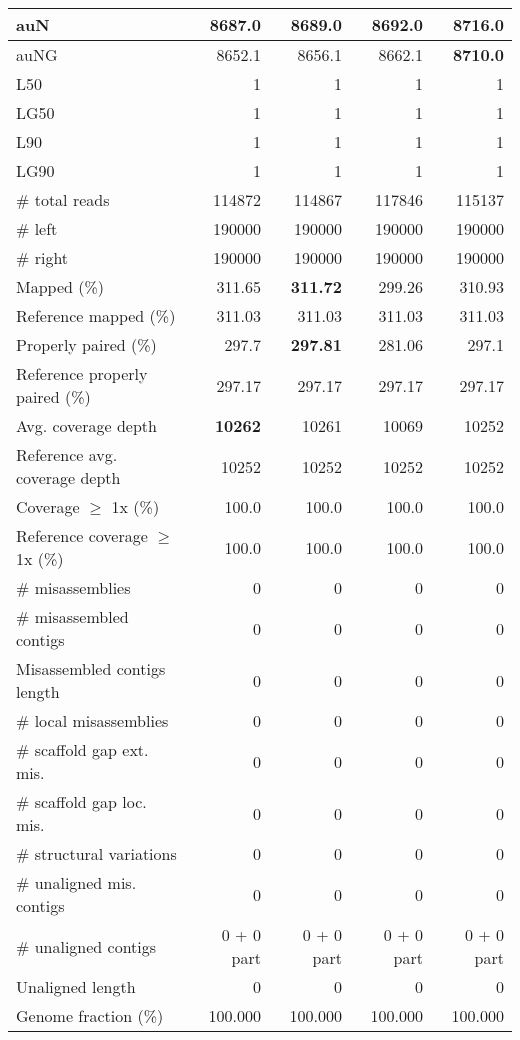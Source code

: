 \documentclass[12pt,a4paper]{article}
\begin{document}
\begin{table}[ht]
\begin{center}
\begin{tabular}{|l*{4}{|r}|}
auN & 8687.0 & 8689.0 & 8692.0 & {\bf 8716.0} \\ \hline
auNG & 8652.1 & 8656.1 & 8662.1 & {\bf 8710.0} \\ \hline
L50 & 1 & 1 & 1 & 1 \\ \hline
LG50 & 1 & 1 & 1 & 1 \\ \hline
L90 & 1 & 1 & 1 & 1 \\ \hline
LG90 & 1 & 1 & 1 & 1 \\ \hline
\# total reads & 114872 & 114867 & 117846 & 115137 \\ \hline
\# left & 190000 & 190000 & 190000 & 190000 \\ \hline
\# right & 190000 & 190000 & 190000 & 190000 \\ \hline
Mapped (\%) & 311.65 & {\bf 311.72} & 299.26 & 310.93 \\ \hline
Reference mapped (\%) & 311.03 & 311.03 & 311.03 & 311.03 \\ \hline
Properly paired (\%) & 297.7 & {\bf 297.81} & 281.06 & 297.1 \\ \hline
Reference properly paired (\%) & 297.17 & 297.17 & 297.17 & 297.17 \\ \hline
Avg. coverage depth & {\bf 10262} & 10261 & 10069 & 10252 \\ \hline
Reference avg. coverage depth & 10252 & 10252 & 10252 & 10252 \\ \hline
Coverage $\geq$ 1x (\%) & 100.0 & 100.0 & 100.0 & 100.0 \\ \hline
Reference coverage $\geq$ 1x (\%) & 100.0 & 100.0 & 100.0 & 100.0 \\ \hline
\# misassemblies & 0 & 0 & 0 & 0 \\ \hline
\# misassembled contigs & 0 & 0 & 0 & 0 \\ \hline
Misassembled contigs length & 0 & 0 & 0 & 0 \\ \hline
\# local misassemblies & 0 & 0 & 0 & 0 \\ \hline
\# scaffold gap ext. mis. & 0 & 0 & 0 & 0 \\ \hline
\# scaffold gap loc. mis. & 0 & 0 & 0 & 0 \\ \hline
\# structural variations & 0 & 0 & 0 & 0 \\ \hline
\# unaligned mis. contigs & 0 & 0 & 0 & 0 \\ \hline
\# unaligned contigs & 0 + 0 part & 0 + 0 part & 0 + 0 part & 0 + 0 part \\ \hline
Unaligned length & 0 & 0 & 0 & 0 \\ \hline
Genome fraction (\%) & 100.000 & 100.000 & 100.000 & 100.000 \\ \hline

\end{tabular}
\end{center}
\end{table}
\end{document}
